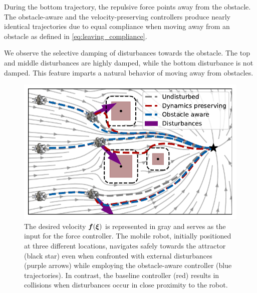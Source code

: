 During the bottom trajectory, the repulsive force points away from the obstacle. The obstacle-aware and the velocity-preserving controllers produce nearly identical trajectories due to equal compliance when moving away from an obstacle as defined in \eqref{eq:leaving_compliance}.

We observe the selective damping of disturbances towards the obstacle. The top and middle disturbances are highly damped, while the bottom disturbance is not damped. This feature imparts a natural behavior of moving away from obstacles.

\begin{figure}
  \centering
  \centerline{\includegraphics[width=0.95\columnwidth]{figures/multi_obstacle_with_damping.pdf}}
  \caption{
  The desired velocity $\boldsymbol{f}(\boldsymbol{\xi})$ is represented in gray and serves as the input for the force controller. The mobile robot, initially positioned at three different locations, navigates safely towards the attractor (black star) even when confronted with external disturbances (purple arrows) while employing the obstacle-aware controller (blue trajectories). In contrast, the baseline controller (red) results in collisions when disturbances occur in close proximity to the robot.
  }
  \label{fig:obstacle_aware_damping_comparison}
\end{figure}

